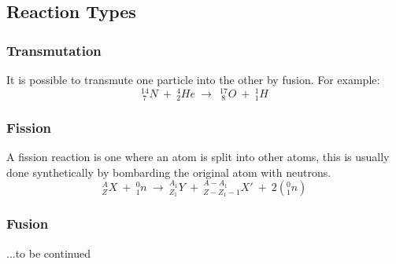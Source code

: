 \documentclass[12pt]{article}
\begin{document}
\newpage

\subsection{Reaction Types}

\subsubsection{Transmutation}

It is possible to transmute one particle into the other by fusion. For example: $$^{14}_{\ 7}N \ + \ ^{4}_{2}He \ \rightarrow \ \ ^{17}_{\ 8}O \ + \ ^{1}_{1}H$$

\subsubsection{Fission}
A fission reaction is one where an atom is split into other atoms, this is usually done synthetically by bombarding the original atom with neutrons. $$^{A}_{Z}X \ + \ ^0_1n \ \rightarrow \ ^{A_1}_{Z_{1}}Y \ + \ ^{A-A_1}_{Z-Z_1-1}X' \ + \ 2\left(^{0}_{1}n \right)$$

\subsubsection{Fusion}
...to be continued
\end{document}
